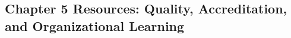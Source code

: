 \begin{refsection}
\chapter{Chapter 5 Resources: Quality, Accreditation, and Organizational Learning}
\label{chap:comp-ch05}



\printbibliography[heading=subbibliography,title={Chapter 5 References}]
\end{refsection}
